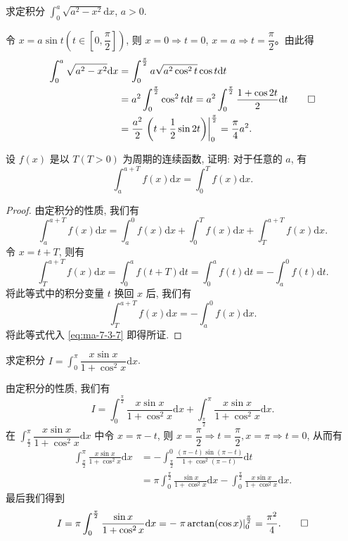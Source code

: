 \begin{example}\label{example:ma-7-4-5}
求定积分 $\int_0^a \sqrt{a^2-x^2}\mathrm dx$, $a>0$.
\end{example}


\begin{solve}
令 $x=a\sin t\left(t\in\left[0,\dfrac{\pi}{2}\right]\right)$, 则 $x=0\Rightarrow t=0$, $x=a\Rightarrow t=\dfrac{\pi}{2}$。由此得
\[
\begin{aligned}
  \int_0^a \sqrt{a^2-x^2}\mathrm dx
  &=\int_0^{\frac{\pi}{2}} a\sqrt{a^2\cos^2 t}\cos t\mathrm dt\\
  &=a^2\int_0^{\frac{\pi}{2}}\cos^2 t\mathrm dt
  =a^2\int_0^{\frac{\pi}{2}}\frac{1+\cos 2t}{2}\mathrm dt\\
  &=\frac{a^2}{2}\left.\left(t+\frac{1}{2}\sin 2t\right)\right|_0^{\frac{\pi}{2}}
  =\frac{\pi}{4}a^2.
\end{aligned}
\qedhere
\]
\end{solve}


\begin{example}\label{example:ma-7-4-6}
设 $f(x)$ 是以 $T(T>0)$ 为周期的连续函数, 证明: 对于任意的 $a$, 有
\[
  \int_a^{a+T} f(x)\mathrm dx=\int_0^T f(x)\mathrm dx.
\]
\end{example}


\begin{proof}
由定积分的性质, 我们有
\begin{equation}
  \int_a^{a+T} f(x)\mathrm dx
  =\int_a^0 f(x)\mathrm dx+\int_0^T f(x)\mathrm dx+\int_T^{a+T} f(x)\mathrm dx.
  \label{eq:ma-7-3-7}
\end{equation}
令 $x=t+T$, 则有
\[
  \int_T^{a+T} f(x)\mathrm dx
  =\int_0^a f(t+T)\mathrm dt
  =\int_0^a f(t)\mathrm dt
  =-\int_a^0 f(t)\mathrm dt.
\]
将此等式中的积分变量 $t$ 换回 $x$ 后, 我们有
\[
  \int_T^{a+T} f(x)\mathrm dx=-\int_a^0 f(x)\mathrm dx.
\]
将此等式代入 \eqref{eq:ma-7-3-7} 即得所证.
\end{proof}


\begin{example}\label{example:ma-7-4-7}
求定积分 $I=\int_0^\pi \dfrac{x\sin x}{1+\cos^2 x}\mathrm dx$.
\end{example}


\begin{solve}
由定积分的性质, 我们有
\[
  I=\int_0^{\frac{\pi}{2}}\frac{x\sin x}{1+\cos^2 x}\mathrm dx
  +\int_{\frac{\pi}{2}}^\pi \frac{x\sin x}{1+\cos^2 x}\mathrm dx.
\]
在 $\int_{\frac{\pi}{2}}^\pi \dfrac{x\sin x}{1+\cos^2 x}\mathrm dx$ 中令 $x=\pi-t$, 则 $x=\dfrac{\pi}{2}\Rightarrow t=\dfrac{\pi}{2},x=\pi\Rightarrow t=0$, 从而有
\[
\begin{aligned}
  \int_{\frac{\pi}{2}}^\pi \frac{x\sin x}{1+\cos^2 x}\mathrm dx
  &=-\int_{\frac{\pi}{2}}^0
  \frac{(\pi-t)\sin(\pi-t)}{1+\cos^2(\pi-t)}\mathrm dt\\
  &=\pi\int_0^{\frac{\pi}{2}}\frac{\sin x}{1+\cos^2 x}\mathrm dx
  -\int_0^{\frac{\pi}{2}}\frac{x\sin x}{1+\cos^2 x}\mathrm dx.
\end{aligned}
\]
最后我们得到
\[
  I=\pi\int_0^{\frac{\pi}{2}}\frac{\sin x}{1+\cos^2 x}\mathrm dx
  =-\left.\pi\arctan(\cos x)\right|_0^{\frac{\pi}{2}}
  =\frac{\pi^2}{4}.
\qedhere
\]
\end{solve}


